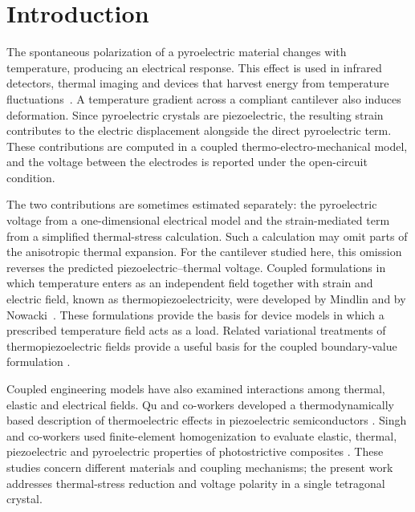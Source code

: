 \documentclass[a4paper,12pt]{elsarticle}
\begin{document}
\section{Introduction}

The spontaneous polarization of a pyroelectric material changes with
temperature, producing an electrical response. This effect is used in
infrared detectors, thermal imaging and devices that harvest energy
from temperature fluctuations~\cite{Lang2005Pyro,Whatmore1986,Lubomirsky2012}.
A temperature gradient across a compliant cantilever also induces
deformation. Since pyroelectric crystals are piezoelectric, the resulting
strain contributes to the electric displacement alongside the direct
pyroelectric term. These contributions are computed in a coupled
thermo-electro-mechanical model, and the voltage between the
electrodes is reported under the open-circuit condition.

The two contributions are sometimes estimated separately:
the pyroelectric voltage from a one-dimensional electrical model and
the strain-mediated term from a simplified thermal-stress calculation.
Such a calculation may omit parts of the anisotropic thermal expansion.
For the cantilever studied here, this omission reverses the predicted
piezoelectric--thermal voltage. Coupled formulations in
which temperature enters as an independent field together with strain and electric
field, known as thermopiezoelectricity, were developed by Mindlin and by Nowacki~\cite{Mindlin1972,Nowacki1975}. These formulations provide the basis for device models
in which a prescribed temperature field acts as a load. Related variational treatments of thermopiezoelectric fields provide a useful basis for the coupled boundary-value formulation \cite{IJESAltay1996}.

Coupled engineering models have also examined interactions among thermal, elastic and electrical fields. Qu and co-workers developed a thermodynamically based description of thermoelectric effects in piezoelectric semiconductors \cite{IJESQu2023}. Singh and co-workers used finite-element homogenization to evaluate elastic, thermal, piezoelectric and pyroelectric properties of photostrictive composites \cite{IJESSingh2022}. These studies concern different materials and coupling mechanisms; the present work addresses thermal-stress reduction and voltage polarity in a single tetragonal crystal.
\end{document}
